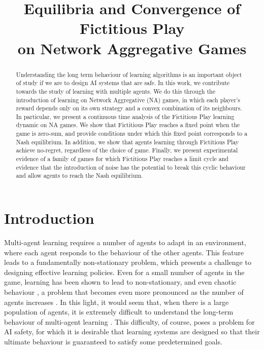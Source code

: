 \documentclass{article}
\title{Equilibria and Convergence of Fictitious Play\\ on Network Aggregative Games}
\theoremstyle{definition}
\begin{document}
\maketitle

\begin{abstract}
Understanding the long term behaviour of learning algorithms is an
important object of study if we are to design AI systems that are
safe. In this work, we contribute towards the study of
learning with multiple agents. We do this through the introduction of
learning on Network Aggregative (NA) games, in which each player's reward
depends only on its own strategy and a convex combination of its
neighbours. In particular, we present a continuous time analysis of
the Fictitious Play learning dynamic on NA games. We show that
Fictitious Play reaches a fixed point when the game is zero-sum, and
provide conditions under which this fixed point corresponds to a Nash
equilibrium. In addition, we show that agents learning through
Fictitious Play achieve no-regret, regardless of the choice of
game. Finally, we present experimental evidence of a family of games
for which Fictitious Play reaches a limit cycle and evidence that the
introduction of noise has the potential to break this cyclic behaviour
and allow agents to reach the Nash equilibrium.
\end{abstract}

\section{Introduction}

Multi-agent learning \cite{Schwartz2014} requires a number of agents
to adapt in an environment, where each agent responds to the behaviour
of the other agents. This feature leads to a fundamentally non-stationary
problem, which presents a challenge to designing effective learning
policies. Even for a small number of agents in the game,
learning has been shown to lead to non-stationary, and even chaotic
behaviour \cite{Sato2002}, a problem that becomes even more
pronounced as the number of agents increases \cite{Sanders2018}. In
this light, it would seem that, when there is a large population of
agents, it is extremely difficult to understand the long-term behaviour
of multi-agent learning \cite{Chotibut2021}. This difficulty, of course, poses a
problem for AI safety, for which it is desirable that learning systems
are designed so that their ultimate behaviour is guaranteed to satisfy
some predetermined goals.
\end{document}
